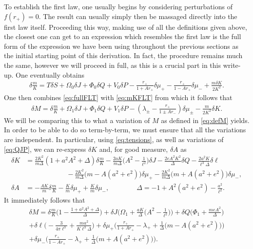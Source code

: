 \documentclass[
twoside,
openright,
frontopenright
]{dmathesis}
\newcommand{\nn}{\nonumber}
\begin{document}
To establish the first law, one usually begins by considering perturbations of
$f(r_+)=0$. The result can usually simply then be massaged directly into the
first law itself. Proceeding this way, making use of all the definitions given
above, the closest one can get to an expression which resembles the first law is
the full form of the expression we have been using throughout the previous
sections as the initial starting point of this derivation. In fact, the
procedure remains much the same, however we will proceed in full, as this is a
crucial part in this write-up. One eventually obtains
\begin{align}\label{eq:mKFLT}
\delta \frac{m}{K} = T\delta S + \Omega_0 \delta J + \Phi_0 \delta Q + V_0
  \delta P - \frac{r_+}{1+Ar_+} \delta \mu_+ - \frac{r_+}{1-Ar_+}\delta \mu_-
  +\frac{m\delta K}{2K^2}. 
\end{align}
One then combines \cref{eq:fullFLT} with \cref{eq:mKFLT} from which it follows that
\begin{align}
\delta M = \delta \frac{m}{K} + \Omega_1 \delta J + \Phi_1 \delta Q + V_1 \delta
  P - \left(\lambda_\pm - \frac{r_+}{1\pm Ar_-}\right) \delta \mu_\pm -
  \frac{m}{2K^2}\delta K. 
\end{align}
We will be comparing this to what a variation of $M$ as defined in
\cref{eq:defM} yields. In order to be able to do so term-by-term, we must ensure
that all the variations are independent. In particular, using
\cref{eq:tensions}, as well as variations of \cref{eq:QJP}, we can re-express
$\delta K$ and, for good measure, $\delta A$ as
\begin{align}
\delta K &=\frac{2K^2}{m\Delta}(1+a^2A^2+\Delta) \delta \frac{m}{K} \nn -
           \frac{2aK}{m\Delta}\Big(A^2-\frac{1}{\ell^2}\Big)\delta
           J-\frac{2eA^2K^2}{\Delta}\delta Q-\frac{2a^2K}{\ell^3\Delta}\delta
           \ell\\ 
&\qquad\qquad\qquad -\frac{2K^2}{m\Delta}\big(m-A(a^2+e^2)\big)\delta\mu_+
                     -\frac{2K^2}{m\Delta}\big(m+A(a^2+e^2)\big)\delta\mu_-,
                     \nn\\ 
\delta A &=-\frac{A K}{m}\delta\frac{m}{K}-\frac{K}{m}\delta\mu_+ +
           \frac{K}{m}\delta \mu_-, \qquad \qquad \Delta =
           -1+A^2(a^2+e^2)-\frac{a^2}{\ell^2}. 
\label{eq:dKdA}
\end{align}
It immediately follows that
\begin{multline}
\delta M = \delta\frac{m}{K} \Big(1-\frac{1+a^2A^2+\Delta}{\Delta}\Big) 
+\delta J \bigg(\Omega_1+\frac{aK}{\Delta}\Big(A^2-\frac{1}{\ell^2}\Big)\bigg) 
+\delta Q \bigg(\Phi_1+\frac{meA^2}{\Delta}\bigg) \\
+\delta\ell \Big(-\frac{3}{4\pi\ell^3}+\frac{ma^2}{K\ell^3\Delta}\Big) 
+\delta \mu_+\Big(\frac{r_+}{1+Ar_+}-\lambda_+
+\frac{1}{\Delta}\big(m-A(a^2+e^2)\big)\Big)\\ 
+\delta \mu_-\Big(\frac{r_+}{1-Ar_+}-\lambda_+
+\frac{1}{\Delta}\big(m+A(a^2+e^2)\big)\Big). 
\label{eq:dM1}
\end{multline}
\end{document}
